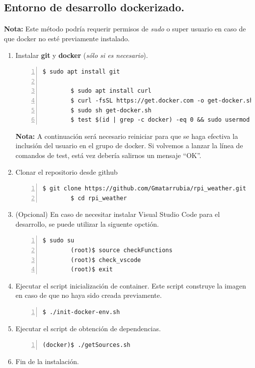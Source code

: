 \subsection{Entorno de desarrollo dockerizado.}

\paragraph{}\textbf{Nota:} Este método podría requerir permisos de \emph{sudo} o super
usuario en caso de que docker no esté previamente instalado.

\begin{enumerate}
    \item Instalar \textbf{\gls{git}} y \textbf{docker} (\emph{sólo si es necesario}).
    \begin{lstlisting}[style=consola, numbers=left]
        $ sudo apt install git

        $ sudo apt install curl
        $ curl -fsSL https://get.docker.com -o get-docker.sh
        $ sudo sh get-docker.sh
        $ test $(id | grep -c docker) -eq 0 && sudo usermod -aG docker $(whoami) || echo "OK"
    \end{lstlisting}
    \textbf{Nota:} A continuación será necesario reiniciar para que se haga efectiva la
    inclusión del usuario en el grupo de docker. Si volvemos a lanzar la línea de
    comandos de test, está vez debería salirnos un mensaje ``OK''.

    \item Clonar el repositorio desde github
    \begin{lstlisting}[style=consola, numbers=left]
        $ git clone https://github.com/Gmatarrubia/rpi_weather.git
        $ cd rpi_weather
    \end{lstlisting}

    \item (Opcional) En caso de necesitar instalar Visual Studio Code para el desarrollo,
    se puede utilizar la siguente opctión.
    \begin{lstlisting}[style=consola, numbers=left]
        $ sudo su
        (root)$ source checkFunctions
        (root)$ check_vscode
        (root)$ exit
    \end{lstlisting}

    \item Ejecutar el script inicialización de container. Este script construye la
    imagen en caso de que no haya sido creada previamente.
    \begin{lstlisting}[style=consola, numbers=left]
        $ ./init-docker-env.sh
    \end{lstlisting}

    \item Ejecutar el script de obtención de dependencias.
    \begin{lstlisting}[style=consola, numbers=left]
        (docker)$ ./getSources.sh
    \end{lstlisting}

    \item Fin de la instalación.
\end{enumerate}

